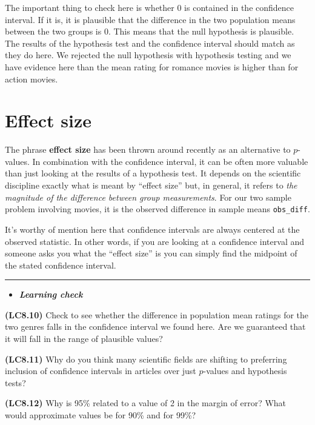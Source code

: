 \documentclass[]{tufte-book}
\let\oldrule=\rule
\renewcommand{\rule}[1]{\oldrule{\linewidth}}
\newenvironment{rmdblock}[1]
  {\begin{shaded*}
  \begin{itemize}
  \renewcommand{\labelitemi}{
    \raisebox{-.7\height}[0pt][0pt]{
    }
  }
  \item
  }
  {
  \end{itemize}
  \end{shaded*}
  }
\newenvironment{learncheck}
  {\begin{rmdblock}{warning}}
  {\end{rmdblock}}
\begin{document}
The important thing to check here is whether 0 is contained in the
confidence interval. If it is, it is plausible that the difference in
the two population means between the two groups is 0. This means that
the null hypothesis is plausible. The results of the hypothesis test and
the confidence interval should match as they do here. We rejected the
null hypothesis with hypothesis testing and we have evidence here than
the mean rating for romance movies is higher than for action movies.

\section{Effect size}\label{effect-size}

The phrase \textbf{effect size} has been thrown around recently as an
alternative to \(p\)-values. In combination with the confidence
interval, it can be often more valuable than just looking at the results
of a hypothesis test. It depends on the scientific discipline exactly
what is meant by ``effect size'' but, in general, it refers to \emph{the
magnitude of the difference between group measurements}. For our two
sample problem involving movies, it is the observed difference in sample
means \texttt{obs\_diff}.

It's worthy of mention here that confidence intervals are always
centered at the observed statistic. In other words, if you are looking
at a confidence interval and someone asks you what the ``effect size''
is you can simply find the midpoint of the stated confidence interval.

\begin{center}\rule{0.5\linewidth}{\linethickness}\end{center}

\begin{learncheck}
\textbf{\emph{Learning check}}
\end{learncheck}

\textbf{(LC8.10)} Check to see whether the difference in population mean
ratings for the two genres falls in the confidence interval we found
here. Are we guaranteed that it will fall in the range of plausible
values?

\textbf{(LC8.11)} Why do you think many scientific fields are shifting
to preferring inclusion of confidence intervals in articles over just
\(p\)-values and hypothesis tests?

\textbf{(LC8.12)} Why is 95\% related to a value of 2 in the margin of
error? What would approximate values be for 90\% and for 99\%?
\end{document}
